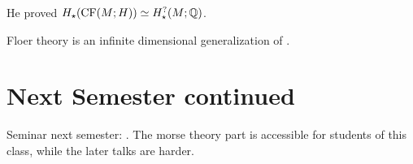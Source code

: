 He proved \(H_\star(\text{CF}(M;H))\simeq H_\star^{\text{?}}(M;\mathbb{Q})\).

Floer theory is an infinite dimensional generalization of .

\section{Next Semester continued}

Seminar next semester: . The morse theory part is accessible for students 
of this class, while the later talks are harder.

